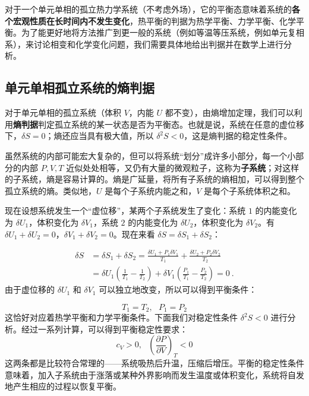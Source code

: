 
对于一个单元单相的孤立热力学系统（不考虑外场），它的平衡态意味着系统的\textbf{各个宏观性质在长时间内不发生变化}，热平衡的判据为热学平衡、力学平衡、化学平衡。为了能更好地将方法推广到更一般的系统（例如等温等压系统，例如单元复相系），来讨论相变和化学变化问题，我们需要具体地给出判据并在数学上进行分析。

\subsection{单元单相孤立系统的熵判据}

对于单元单相的孤立系统（体积 $V$，内能 $U$ 都不变），由熵增加定理，我们可以利用\textbf{熵判据}判定孤立系统的某一状态是否为平衡态。也就是说，系统在任意的虚位移下，$\delta S=0$；熵还应当具有极大值，所以 $\delta^2S<0$，这是熵判据的稳定性条件。

虽然系统的内部可能宏大复杂的，但可以将系统“划分”成许多小部分，每一个小部分的内部 $P,V,T$ 近似处处相等，又仍有大量的微观粒子，这称为\textbf{子系统}；对这样的子系统，熵是容易计算的。熵是广延量，将所有子系统的熵相加，可以得到整个孤立系统的熵。类似地，$U$ 是每个子系统内能之和，$V$ 是每个子系统体积之和。

现在设想系统发生一个“虚位移”，某两个子系统发生了变化：系统 $1$ 的内能变化为 $\delta U_1$，体积变化为 $\delta V_1$，系统 $2$ 的内能变化为 $\delta U_2$，体积变化为 $\delta V_2$。有 $\delta U_1+\delta U_2=0$，$\delta V_1+\delta V_2=0$。现在来看 $\delta S=\delta S_1+\delta S_2$：

\begin{align}
\delta S&=\delta S_1+\delta S_2=\frac{\delta U_1+P_1\delta V_1}{T_1}+\frac{\delta U_2+P_2\delta V_2}{T_2}
\\
&=\delta U_1\left(\frac{1}{T_1}-\frac{1}{T_2}\right)
+\delta V_1\left(\frac{P_1}{T_1}-\frac{P_2}{T_2}\right)=0~.
\end{align}
由于虚位移的 $\delta U_1$ 和 $\delta V_1$ 可以独立地改变，所以可以得到平衡条件：

\begin{equation}
T_1=T_2,\ \ \ P_1=P_2
\end{equation}
这恰好对应着热学平衡和力学平衡条件。下面我们对稳定性条件 $\delta^2 S<0$ 进行分析。经过一系列计算，可以得到平衡稳定性要求：
\begin{equation}
c_V>0,\ \ \ \left(\frac{\partial P}{\partial V}\right)_T<0
\end{equation}
这两条都是比较符合常理的——系统吸热后升温，压缩后增压。平衡的稳定性条件意味着，加入子系统由于涨落或某种外界影响而发生温度或体积变化，系统将自发地产生相应的过程以恢复平衡。


